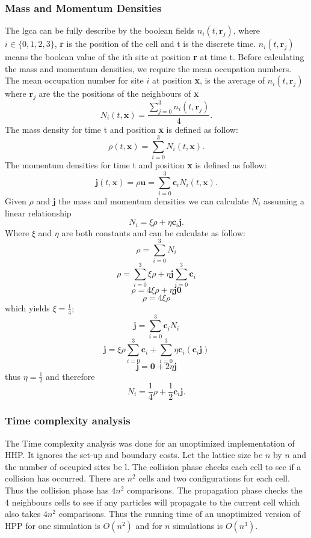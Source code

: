 \documentclass[a4paper,12pt]{article}
\begin{document}
\subsubsection{Mass and Momentum Densities}
The \acrshort{lgca} can be fully describe by the boolean fields $n_{i}(t, \textbf{r}_{j})$, where $i \in \{0, 1, 2, 3\}$, \textbf{r} is the position of the cell and t is the discrete time. $n_{i}(t, \textbf{r}_{j})$ means the boolean value of the ith site at position \textbf{r} at time t.
Before calculating the mass and momentum densities, we require the mean occupation numbers. The mean occupation number for site $i$ at position \textbf{x}, is the average of $n_{i}(t, \textbf{r}_{j})$ where 
$\textbf{r}_{j}$ are the the positions of the neighbours of \textbf{x}
\[N_{i}(t,\textbf{x}) = \frac{\sum_{j = 0}^{3} n_{i}(t,\textbf{r}_{j})}{4}.\]
The mass density for time t and position \textbf{x} is defined as follow:
\[\rho(t, \textbf{x}) = \sum_{i = 0}^{3} N_{i}(t, \textbf{x}).\]
The momentum densities for time t and position \textbf{x} is defined as follow:
\[\boldsymbol{j}(t, \textbf{x}) = \rho\boldsymbol{u} = \sum_{i = 0}^{3} \textbf{c}_{i}N_{i}(t, \textbf{x}).\]
Given $\rho$ and $\boldsymbol{j}$ the mass and momentum densities we can calculate $N_{i}$ assuming
a linear relationship
\[N_{i} = \xi\rho + \eta\textbf{c}_{i}\boldsymbol{j}.\]
Where $\xi$ and $\eta$ are both constants and can be calculate as follow:
\[\rho = \sum_{i = 0}^{3} N_{i}
\]
\[\rho = \sum_{i = 0}^{3} \xi\rho  + \eta\boldsymbol{j}\sum_{i = 0}^{3} \textbf{c}_{i}
\]
\[\rho = 4\xi\rho  + \eta\boldsymbol{j}\boldsymbol{0} 
\]
\[\rho = 4\xi\rho
\]
which yields $\xi = \frac{1}{4};$
\[\boldsymbol{j} = \sum_{i = 0}^{3} \textbf{c}_{i}N_{i}\]
\[\boldsymbol{j} = \xi\rho\sum_{i = 0}^{3} \textbf{c}_{i} + \sum_{i = 0}^{3} \eta\textbf{c}_{i}(\textbf{c}_{i}\boldsymbol{j})\]
\[\boldsymbol{j} = \boldsymbol{0} + 2\eta\boldsymbol{j}\]
thus $\eta = \frac{1}{2}$ and therefore
	\[N_{i} =\frac{1}{4}\rho + \frac{1}{2}\textbf{c}_{i}\boldsymbol{j}.\]
\subsubsection{Time complexity analysis}
The Time complexity analysis was done for an unoptimized implementation of HHP. It ignores the set-up and boundary costs. Let the lattice size be $n$ by $n$ and the number of occupied sites be l. The collision phase checks each cell to see if a collision has occurred. There are $n^2$ cells and two configurations for each cell. Thus the collision phase has $4n^2$ comparisons.
 The propagation phase checks the 4 neighbours cells to see if any particles will propagate to the current cell which also takes $4n^2$ comparisons. Thus the running time of an unoptimized version of HPP for one simulation is
 $O(n^2)$ and for $n$ simulations is $O(n^3)$.
\end{document}
